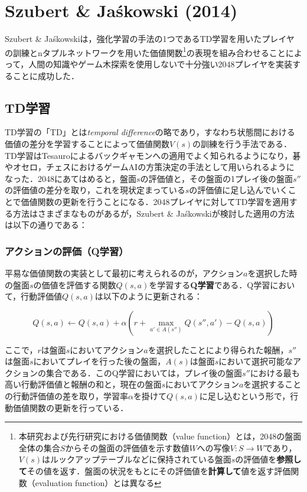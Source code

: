 \documentclass{suribt}
\begin{document}
\section{Szubert \& Ja\'{s}kowski (2014)}
Szubert \& Ja\'{s}kowskiは，強化学習の手法の1つであるTD学習を用いたプレイヤの訓練とnタプルネットワークを用いた価値関数\footnote{本研究および先行研究における価値関数（value function）とは，2048の盤面全体の集合$S$からその盤面の評価値を示す数値$W$への写像$V: S \rightarrow W$であり，$V(s)$はルックアップテーブルなどに保持されている盤面$s$の評価値を\textbf{参照して}その値を返す．盤面の状況をもとにその評価値を\textbf{計算して}値を返す評価関数（evaluation function）とは異なる}の表現を組み合わせることによって，人間の知識やゲーム木探索を使用しないで十分強い2048プレイヤを実装することに成功した．

\subsection{TD学習}
TD学習の「TD」とは\emph{temporal difference}の略であり，すなわち状態間における価値の差分を学習することによって価値関数$V(s)$の訓練を行う手法である．TD学習はTesauroによるバックギャモンへの適用\cite{Tesauro}でよく知られるようになり，碁\cite{Runarsson}\cite{Schraudolph}やオセロ\cite{Dries}\cite{SzubertOthello}，チェス\cite{Baxter}におけるゲームAIの方策決定の手法として用いられるようになった．2048にあてはめると，盤面$s$の評価値と，その盤面の1プレイ後の盤面$s''$の評価値の差分を取り，これを現状定まっている$s$の評価値に足し込んでいくことで価値関数の更新を行うことになる．2048プレイヤに対してTD学習を適用する方法はさまざまなものがあるが，Szubert \& Ja\'{s}kowskiが検討した適用の方法は以下の通りである：

\subsubsection{アクションの評価（Q学習）}
平易な価値関数の実装として最初に考えられるのが，アクション$a$を選択した時の盤面$s$の価値を評価する関数$Q(s,a)$を学習する\textbf{Q学習}である．Q学習において，行動評価値$Q(s,a)$は以下のように更新される：

\[
	Q(s,a) \leftarrow Q(s,a) + {\alpha} (r + \max_{a' \in A(s'')} Q(s'', a') - Q(s,a))
\]

ここで，$r$は盤面$s$においてアクション$a$を選択したことにより得られた報酬，$s''$は盤面$s$においてプレイを行った後の盤面，$A(s)$は盤面$s$において選択可能なアクションの集合である．このQ学習においては，プレイ後の盤面$s''$における最も高い行動評価値と報酬の和と，現在の盤面$s$においてアクション$a$を選択することの行動評価値の差を取り，学習率${\alpha}$を掛けて$Q(s,a)$に足し込むという形で，行動価値関数の更新を行っている．
\end{document}
